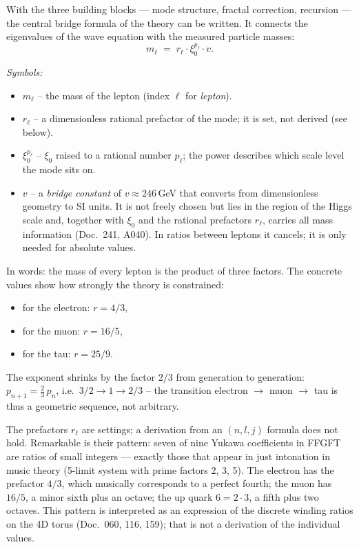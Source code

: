 With the three building blocks --- mode structure, fractal
correction, recursion --- the central bridge formula of the theory
can be written. It connects the eigenvalues of the wave equation
with the measured particle masses:
\[
  m_\ell \;=\; r_\ell \cdot \xi_0^{p_\ell} \cdot v.
\]

\noindent\textit{Symbols:}
\begin{itemize}\setlength\itemsep{0pt}
  \item $m_\ell$ -- the mass of the lepton (index $\ell$ for
        \emph{lepton}).
  \item $r_\ell$ -- a dimensionless rational prefactor of the mode;
        it is set, not derived (see below).
  \item $\xi_0^{p_\ell}$ -- $\xi_0$ raised to a rational number
        $p_\ell$; the power describes which scale level the mode
        sits on.
  \item $v$ -- a \emph{bridge constant} of $v \approx 246$\,GeV
        that converts from dimensionless geometry to SI units. It is
        not freely chosen but lies in the region of the Higgs scale
        and, together with $\xi_0$ and the rational prefactors $r_\ell$,
        carries all mass information (Doc.~241, A040). In ratios between
        leptons it cancels; it is only needed for absolute values.
\end{itemize}

\medskip\noindent

In words: the mass of every lepton is the product of three factors.
The concrete values show how strongly the theory is constrained:
\begin{itemize}
  \item for the electron: $r = 4/3$,
  \item for the muon: $r = 16/5$,
  \item for the tau: $r = 25/9$.
\end{itemize}
The exponent shrinks by the factor $2/3$ from generation to
generation: $p_{n+1} = \tfrac{2}{3}\,p_n$, i.e.\ $3/2 \to 1 \to 2/3$ -- the transition electron $\to$ muon $\to$ tau is
thus a geometric sequence, not arbitrary.

The prefactors $r_\ell$ are settings; a derivation from an
$(n,l,j)$ formula does not hold. Remarkable is their pattern: seven of
nine Yukawa coefficients in FFGFT are ratios of small integers ---
exactly those that appear in just intonation in music theory
(5-limit system with prime factors 2, 3, 5). The electron has the
prefactor $4/3$, which musically corresponds to a perfect fourth;
the muon has $16/5$, a minor sixth plus an octave; the up quark
$6 = 2 \cdot 3$, a fifth plus two octaves. This pattern is
interpreted as an expression of the discrete winding ratios on the
4D torus (Doc.~060, 116, 159); that is not a derivation of the
individual values.

